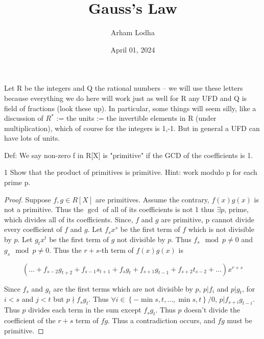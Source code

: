\documentclass{article}
\begin{document}
\title{Gauss's Law}
\author{Arham Lodha}%
\date{April 01, 2024}%
\maketitle


Let R be the integers and Q the rational numbers  -- we will use these letters because everything we do here will work just as well for R any UFD and Q is field of fractions (look these up). In particular, some
things will seem silly, like a discussion of $R^*$ := the units := the invertible elements in R (under multiplication),
which of course for the integers is 1,-1. But in general a UFD can have lots of units. 

Def: We say non-zero f in R[X] is "primitive" if the GCD of the coefficients is 1.

\begin{PROB}{1}\label{Problem 1.}
    Show that the product of primitives is primitive. Hint: work modulo p for each prime p.
\end{PROB}
\begin{proof}
    Suppose $f, g \in R[X]$ are primitives. Assume the contrary, $f(x)g(x)$ is not a primitive. Thus the $\gcd$ of all of its coefficients is not 1 thus $\exists p$, prime, which divides all of its coefficients. Since, $f$ and $g$ are primitive, p cannot divide every coefficient of $f$ and $g$. Let $f_s x^s$ be the first term of $f$ which is not divisible by $p$. Let $g_tx^t$ be the first term of $g$ not divisible by $p$. Thus $f_s \mod p \neq 0$ and $g_s \mod p \neq 0$. Thus the $r + s$-th term of $f(x)g(x)$ is
    
    \begin{equation*}
        (\dots + f_{s - 2}g_{t + 2} + f_{s - 1}s_{t + 1} + f_{s}g_{t} + f_{s + 1}g_{t - 1} + f_{s + 2}t_{s - 2} + \dots)x^{r + s}
    \end{equation*}

    Since $f_s$ and $g_t$ are the first terms which are not divisible by $p$, $p | f_{i}$ and $p | g_t$, for $i < s$ and $j < t$ but $p \nmid f_{s}g_t$. Thus $\forall i \in \left\{ -\min{s, t}, \dots, \min{s, t} \right\} / {0}$, $p | f_{s + i}g_{t - i}$. Thus $p$ divides each term in the sum except $f_{s}g_t$. Thus $p$ doesn't divide the coefficient of the $r + s$ term of $fg$. Thus a contradiction occurs, and $fg$ must be primitive.         
\end{proof}

\bigskip
\end{document}
